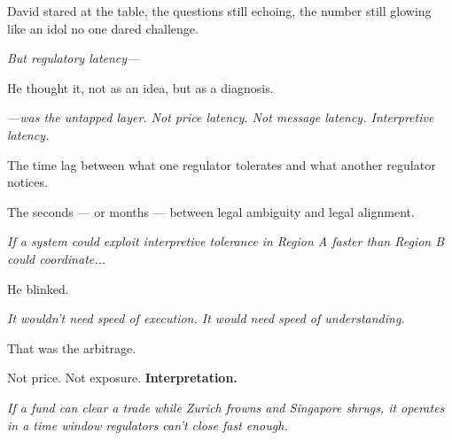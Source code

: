 \medskip


\medskip

David stared at the table, the questions still echoing,  
the number still glowing like an idol no one dared challenge.

\textit{But regulatory latency—}

He thought it, not as an idea, but as a diagnosis.

\textit{—was the untapped layer.  
Not price latency. Not message latency.  
Interpretive latency.}

The time lag between what one regulator tolerates  
and what another regulator notices.

The seconds — or months — between legal ambiguity and legal alignment.

\textit{If a system could exploit interpretive tolerance in Region A  
faster than Region B could coordinate...}

He blinked.

\textit{It wouldn’t need speed of execution.  
It would need speed of understanding.}

That was the arbitrage.

Not price.  
Not exposure.  
\textbf{Interpretation.}

\textit{If a fund can clear a trade while Zurich frowns and Singapore shrugs,  
it operates in a time window regulators can’t close fast enough.}

